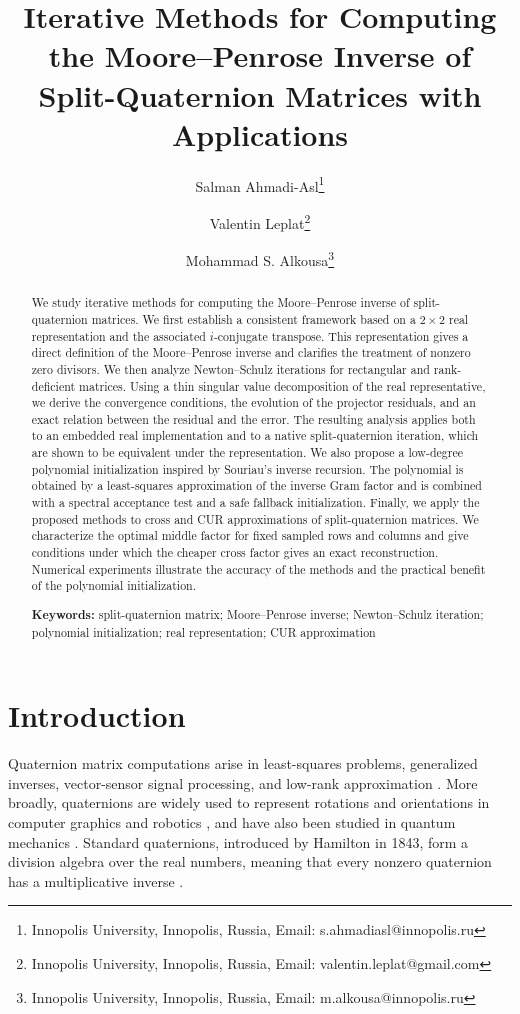 \documentclass[12pt,a4paper]{article}
\title{Iterative Methods for Computing the Moore--Penrose Inverse of Split-Quaternion Matrices with Applications}
\author{
Salman Ahmadi-Asl\thanks{Innopolis University, Innopolis, Russia, Email: s.ahmadiasl@innopolis.ru} \and
Valentin Leplat\thanks{ Innopolis University, Innopolis, Russia, Email: valentin.leplat@gmail.com} \and
Mohammad S. Alkousa\thanks{Innopolis University, Innopolis, Russia, Email: m.alkousa@innopolis.ru} 
}
\date{}
\theoremstyle{plain}
\theoremstyle{definition}
\theoremstyle{remark}
\begin{document}
\maketitle


\begin{abstract}
We study iterative methods for computing the Moore--Penrose inverse of split-quaternion matrices. We first establish a consistent framework based on a \(2\times2\) real representation and the associated \(i\)-conjugate transpose. This representation gives a direct definition of the Moore--Penrose inverse and clarifies the treatment of nonzero zero divisors. We then analyze Newton--Schulz iterations for rectangular and rank-deficient matrices. Using a thin singular value decomposition of the real representative, we derive the convergence conditions, the evolution of the projector residuals, and an exact relation between the residual and the error. The resulting analysis applies both to an embedded real implementation and to a native split-quaternion iteration, which are shown to be equivalent under the representation. We also propose a low-degree polynomial initialization inspired by Souriau's inverse recursion. The polynomial is obtained by a least-squares approximation of the inverse Gram factor and is combined with a spectral acceptance test and a safe fallback initialization. Finally, we apply the proposed methods to cross and CUR approximations of split-quaternion matrices. We characterize the optimal middle factor for fixed sampled rows and columns and give conditions under which the cheaper cross factor gives an exact reconstruction. Numerical experiments illustrate the accuracy of the methods and the practical benefit of the polynomial initialization.

\noindent\textbf{Keywords:} split-quaternion matrix; Moore--Penrose inverse; Newton--Schulz iteration; polynomial initialization; real representation; CUR approximation
\end{abstract}


\section{Introduction}
\label{sec:introduction}
Quaternion matrix computations arise in least-squares problems, generalized
inverses, vector-sensor signal processing, and low-rank approximation
\cite{ahmadi2017iterative,ahmadi2017efficient,kyrchei2025quaternion,
le2004singular,ahmadi2026pass}. More broadly, quaternions are widely used
to represent rotations and orientations in computer graphics and robotics
\cite{shoemake1985animating,yuan1988closed}, and have also been studied in
quantum mechanics \cite{finkelstein1962foundations,de2000right}. Standard
quaternions, introduced by Hamilton in 1843, form a division algebra over
the real numbers, meaning that every nonzero quaternion has a multiplicative
inverse \cite{hamilton1843species}.
\end{document}
